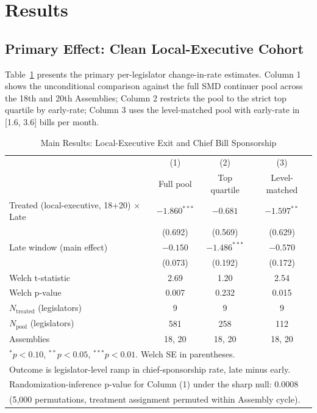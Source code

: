 \documentclass[11pt]{article}
\begin{document}
\section{Results}

\subsection{Primary Effect: Clean Local-Executive Cohort}

Table~\ref{tab:main} presents the primary per-legislator change-in-rate estimates. Column 1 shows the unconditional comparison against the full SMD continuer pool across the 18th and 20th Assemblies; Column 2 restricts the pool to the strict top quartile by early-rate; Column 3 uses the level-matched pool with early-rate in [1.6, 3.6] bills per month.

\begin{table}[H]
\centering
\caption{Main Results: Local-Executive Exit and Chief Bill Sponsorship}
\label{tab:main}
\begin{tabular}{lccc}
\toprule
 & (1) & (2) & (3) \\
 & Full pool & Top quartile & Level-matched \\
\midrule
Treated (local-executive, 18+20) $\times$ Late & $-1.860^{***}$ & $-0.681$ & $-1.597^{**}$ \\
 & (0.692) & (0.569) & (0.629) \\
Late window (main effect) & $-0.150$ & $-1.486^{***}$ & $-0.570$ \\
 & (0.073) & (0.192) & (0.172) \\
Welch t-statistic & 2.69 & 1.20 & 2.54 \\
Welch p-value & 0.007 & 0.232 & 0.015 \\
\midrule
$N_{\text{treated}}$ (legislators) & 9 & 9 & 9 \\
$N_{\text{pool}}$ (legislators) & 581 & 258 & 112 \\
Assemblies & 18, 20 & 18, 20 & 18, 20 \\
\bottomrule
\multicolumn{4}{l}{\footnotesize $^*p<0.10$, $^{**}p<0.05$, $^{***}p<0.01$. Welch SE in parentheses.} \\
\multicolumn{4}{l}{\footnotesize Outcome is legislator-level ramp in chief-sponsorship rate, late minus early.} \\
\multicolumn{4}{l}{\footnotesize Randomization-inference p-value for Column (1) under the sharp null: 0.0008} \\
\multicolumn{4}{l}{\footnotesize (5{,}000 permutations, treatment assignment permuted within Assembly cycle).} \\
\end{tabular}
\end{table}
\end{document}
